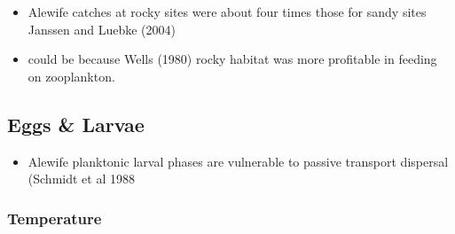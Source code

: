 \documentclass[
]{book}
\providecommand{\tightlist}{%
  \setlength{\itemsep}{0pt}\setlength{\parskip}{0pt}}
\begin{document}
\begin{itemize}
\tightlist
\item
  Alewife catches at rocky sites were about four times those for sandy sites Janssen and Luebke (2004)
\item
  could be because Wells (1980) rocky habitat was more profitable in feeding on zooplankton.
\end{itemize}

\hypertarget{eggs-larvae}{%
\subsection{Eggs \& Larvae}\label{eggs-larvae}}

\begin{itemize}
\tightlist
\item
  Alewife planktonic larval phases are vulnerable to passive transport dispersal (Schmidt et al 1988
\end{itemize}

\hypertarget{temperature-2}{%
\subsubsection{Temperature}\label{temperature-2}}
\end{document}
